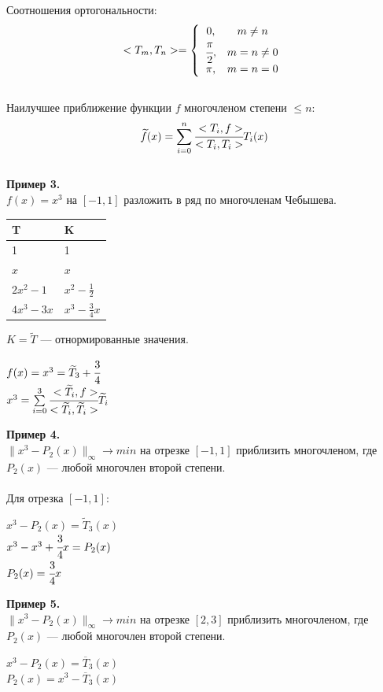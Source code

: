 \documentclass[12pt]{article}
\theoremstyle{definition}
\numberwithin{equation}{section}
\begin{document}
Соотношения ортогональности: $$<T_m, T_n>=
\left\{  
\begin{array}{ccl}  
    0,& m\neq n\\
    \cfrac{\pi}{2},& m=n\neq 0\\
    \pi,& m=n=0\\  
\end{array}   
\right.  
$$
\\
Наилучшее приближение функции $f$ многочленом степени $\leqslant n:$ $$\widetilde f(x)=\sum\limits_{i=0}^n\cfrac{<T_i, f>}{<T_i, T_i>}T_i(x)$$\\
\textbf{Пример 3.}\\
$f(x)=x^3$ на $[-1, 1]$ разложить в ряд по многочленам Чебышева.
\begin{center}
\begin{tabular}{|l|l|}
\hline
T & K \\ \hline
1 & 1 \\ \hline
$x$ & $x$ \\ \hline
$2x^2-1$ & $x^2-\frac{1}{2}$ \\ \hline
$4x^3-3x$ & $x^3-\frac{3}{4}x$\\ \hline
\end{tabular}
\end{center}
$K=\widetilde T$ --- отнормированные значения.\begin{center}
$f(x)=x^3=\widetilde T_3+\cfrac{3}{4}\title{T_1}$\\
$x^3=\sum\limits_{i=0}^3\cfrac{<\widetilde T_i, f>}{<\widetilde T_i, \widetilde T_i>}\widetilde T_i$
\end{center}
\textbf{Пример 4.}\\
$\parallel x^3-P_2(x) \parallel_\infty \to min$ на отрезке $[-1, 1]$ приблизить многочленом, где $P_2(x)$ --- любой многочлен второй степени.\\
\\
Для отрезка $[-1, 1]$: \begin{center}
$x^3-P_2(x)=\widetilde T_3(x)$\\
$x^3-x^3+\cfrac{3}{4}x=P_2(x)$\\
$P_2(x)=\cfrac{3}{4}x$
\end{center}
\textbf{Пример 5.}\\
$\parallel x^3-P_2(x) \parallel_\infty \to min$ на отрезке $[2, 3]$ приблизить многочленом, где $P_2(x)$ --- любой многочлен второй степени.\\
\begin{center}
$x^3-P_2(x)=\overline T_3(x)$\\
$P_2(x)=x^3-\overline T_3(x)$\\
\end{center}
\end{document}
